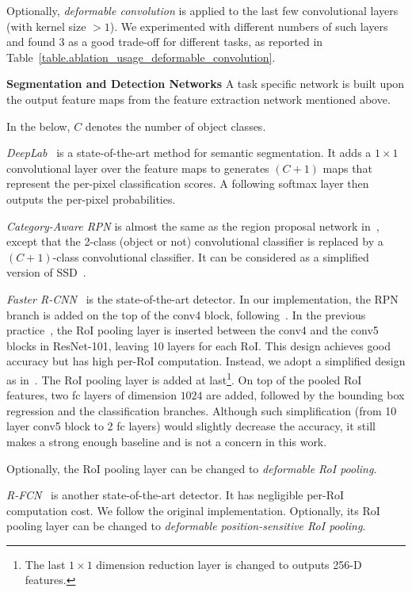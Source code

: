 \documentclass[10pt,twocolumn,letterpaper]{article}
\begin{document}
Optionally, \emph{deformable convolution} is applied to the last few convolutional layers (with kernel size $>1$). We experimented with different numbers of such layers and found $3$ as a good trade-off for different tasks, as reported in Table~\ref{table.ablation_usage_deformable_convolution}.

\textbf{Segmentation and Detection Networks} A task specific network is built upon the output feature maps from the feature extraction network mentioned above.

In the below, $C$ denotes the number of object classes.

\emph{DeepLab}~\cite{chen2016deeplab} is a state-of-the-art method for semantic segmentation. It adds a $1 \times 1$ convolutional layer over the feature maps to generates $(C+1)$ maps that represent the per-pixel classification scores. A following softmax layer then outputs the per-pixel probabilities.

\emph{Category-Aware RPN} is almost the same as the region proposal network in~\cite{ren2015faster}, except that the 2-class (object or not) convolutional classifier is replaced by a $(C+1)$-class convolutional classifier. It can be considered as a simplified version of SSD~\cite{liu2016ssd}.

\emph{Faster R-CNN}~\cite{ren2015faster} is the state-of-the-art detector. In our implementation, the RPN branch is added on the top of the conv4 block, following~\cite{ren2015faster}. In the previous practice~\cite{he2016deep,huang2016speed}, the RoI pooling layer is inserted between the conv4 and the conv5 blocks in ResNet-101, leaving 10 layers for each RoI. This design achieves good accuracy but has high per-RoI computation. Instead, we adopt a simplified design as in~\cite{lin2016feature}. The RoI pooling layer is added at last\footnote{The last $1\times 1$ dimension reduction layer is changed to outputs 256-D features.}. On top of the pooled RoI features, two fc layers of dimension $1024$ are added, followed by the bounding box regression and the classification branches. Although such simplification (from 10 layer conv5 block to 2 fc layers) would slightly decrease the accuracy, it still makes a strong enough baseline and is not a concern in this work.

Optionally, the RoI pooling layer can be changed to \emph{deformable RoI pooling}.

\emph{R-FCN}~\cite{dai2016rfcn} is another state-of-the-art detector. It has negligible per-RoI computation cost. We follow the original implementation. Optionally, its RoI pooling layer can be changed to \emph{deformable position-sensitive RoI pooling}.
\end{document}
